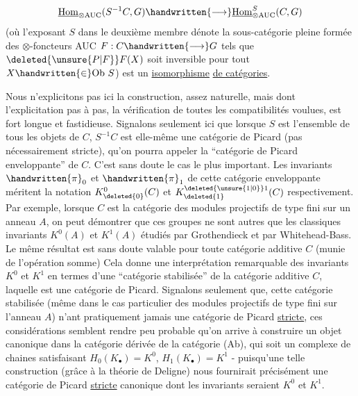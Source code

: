 \[
\underline{\mathrm{Hom}}_{\otimes\mathrm{AUC}}(S^{-1}C,G)\handwritten{\longrightarrow}\underline{\mathrm{Hom}}_{\otimes\mathrm{AUC}}^{S}(C,G)
\]
(où l'exposant $S$ dans le deuxième membre dénote la sous-catégorie pleine formée des $\otimes$-foncteurs AUC $F:C\handwritten{\longrightarrow}G$ tels que $\deleted{\unsure{P|F}}F(X)$ soit inversible pour tout $X\handwritten{\in}\mathrm{Ob}\ S$) est un \uline{isomorphisme} \uline{de catégories}.

Nous n'explicitons pas ici la construction, assez naturelle, mais dont l'explicitation pas à pas,  la vérification de toutes les compatibilités voulues, est fort longue et fastidieuse. Signalons seulement ici que lorsque $S$ est l'ensemble de tous les objets de $C$, $S^{-1}C$ est elle-même une catégorie de Picard (pas nécessairement stricte), qu'on pourra appeler la ``catégorie de Picard enveloppante'' de $C$. C'est sans doute le cas le plus important. Les invariants $\handwritten{\pi}_{0}$ et $\handwritten{\pi}_{1}$ de cette catégorie enveloppante méritent la notation $K^{0}_{\deleted{0}}(C)$ et $K^{\deleted{\unsure{1|0}}1}_{\deleted{1}}(C)$ respectivement. Par exemple, lorsque $C$ est la catégorie des modules projectifs de type fini sur un anneau $A$,  on peut démontrer que ces groupes ne sont autres que les classiques invariants $K^{0}(A)$ et $K^{1}(A)$ étudiés par Grothendieck et par Whitehead-Bass. Le même résultat est sans doute valable pour toute catégorie additive $C$ (munie de  l'opération somme) Cela donne une interprétation remarquable des invariants $K^{0}$ et $K^{1}$ en termes d'une ``catégorie stabilisée'' \handwritten{(}de la catégorie additive $C$\handwritten{)}, laquelle est une catégorie de Picard. Signalons seulement que, cette catégorie stabilisée (même dans le cas particulier des modules projectifs de type fini sur l'anneau $A$) n'ant pratiquement jamais une catégorie de Picard \uline{stricte}, ces considérations semblent rendre peu probable qu'on arrive à construire un objet canonique dans la catégorie dérivée de la catégorie (Ab), qui soit un complexe de chaines satisfaisant $H_{0}(K_{\bullet})=K^{0}$, $H_{1}(K_{\bullet})=K^{1}$ - puisqu'une telle construction (grâce à la théorie de Deligne) nous fournirait précisément une catégorie de Picard \uline{stricte} canonique dont les invariants seraient $K^{0}$ et $K^{1}$.

